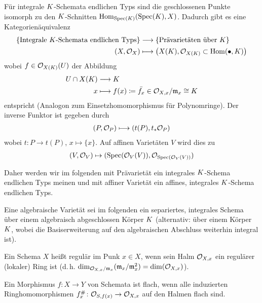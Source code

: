 \documentclass[german]{scrreprt}
\begin{document}
\begin{Definition}[$S$-Modell]
\begin{Definition}[Varietät]
Für integrale $K$-Schemata endlichen Typs sind die geschlossenen
Punkte isomorph zu den $K$-Schnitten 
$\operatorname{Hom}_{\operatorname{Spec}(K)}(\operatorname{Spec}(K),X)$.
Dadurch gibt es eine Kategorienäquivalenz
\begin{align*}
  \left\{\text{Integrale $K$-Schemata endlichen Typs}\right\}
  &\longrightarrow
  \left\{\text{Prävarietäten über $K$}\right\}\\
  (X,\mathcal{O}_X) 
  &\longmapsto
    \left( X(K), \mathcal{O}_{X(K)}\subset \operatorname{Hom}(\bullet, K) \right)
\end{align*}
wobei $f\in\mathcal{O}_{X(K)}(U)$ der Abbildung 
\begin{align*}
  U\cap X(K) &\longrightarrow K\\
  x  &\longmapsto f(x)
  \coloneqq \bar{f_x}\in\mathcal{O}_{X,x}/\mathfrak{m}_x\cong K
\end{align*}
entspricht (Analogon zum Einsetzhomomorphismus für Polynomringe).
Der inverse Funktor ist gegeben durch
\begin{align*}
  (P,\mathcal{O}_P) \longmapsto (t(P), t_\ast\mathcal{O}_P) 
\end{align*}
wobei $t\colon P\to t(P)$, $x\mapsto \{x\}$. Auf affinen Varietäten
$V$ wird dies zu
\begin{gather*}
  (V, \mathcal{O}_V) \mapsto (\operatorname{Spec}(\mathcal{O}_V(V)), \mathcal{O}_{\operatorname{Spec}(\mathcal{O}_V(V))})
\end{gather*}
\cite[siehe][Theorem 3.37]{wedhorn}

Daher werden wir im folgenden mit Prävarietät ein integrales
$K$-Schema endlichen Typs meinen und mit affiner Varietät ein affines,
integrales $K$-Schema endlichen Typs.

Eine algebraische Varietät sei im folgenden ein separiertes, integrales
Schema über einem algebraisch abgeschlossen Körper $K$
(alternativ: über einem Körper $K$, wobei die Basiserweiterung auf
den algebraischen Abschluss weiterhin integral ist).
\end{Definition}

\begin{Definition}[Regulär]
Ein Schema $X$ heißt regulär im Punk $x\in X$, wenn sein Halm
$\mathcal{O}_{X,x}$ ein regulärer (lokaler) Ring ist
(d.\,h. $\dim_{\mathcal{O}_{X,x}/\mathfrak{m}_x}(\mathfrak{m}_x/\mathfrak{m}_x^2)=\dim(\mathcal{O}_{X,x})$).
\end{Definition}

\begin{Definition}
Ein Morphismus $f\colon X\to Y$ von Schemata ist flach, wenn alle
induzierten Ringhomomorphismen $f_x^\#\colon \mathcal{O}_{S,f(x)}\to\mathcal{O}_{X,x}$  auf
den Halmen flach sind.
\cite[siehe][]{bosch, goodreduction}
\end{Definition}


\end{Definition}
\end{document}
